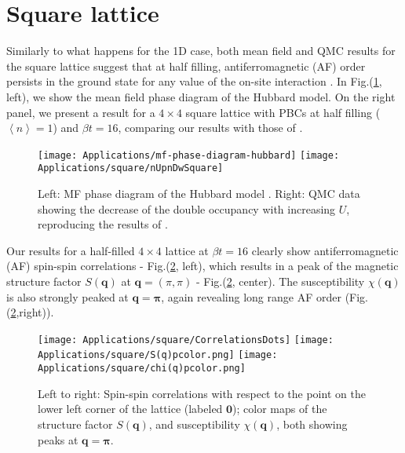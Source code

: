 \section{Square lattice}
\label{sec:square}

Similarly to what happens for the \acs{1D} case, both mean field and \ac{QMC} results for the square lattice suggest that at half filling, antiferromagnetic (\acs{AF}) order persists in the ground state for any value of the on-site interaction \cite{claveau_mean-field_2014, gouveia_magnetic_2015, white_numerical_1989, hirsch_two-dimensional_1985}.
In Fig.(\ref{fig:mfHubbardPhaseDiagram}, left), we show the mean field phase diagram of the Hubbard model.
On the right panel, we present a result for a $4 \times 4$ square lattice with \acs{PBC}s at half filling ($\left\langle n\right\rangle = 1$) and $\beta t = 16$, comparing our results with those of \cite{white_numerical_1989}.
\vspace{-0.4cm}
\begin{figure}[H]
\hspace{-0.18cm}
\texttt{[image: Applications/mf-phase-diagram-hubbard]}
\texttt{[image: Applications/square/nUpnDwSquare]}
\caption[Mean field phase diagram of the Hubbard model. \ac{QMC} data showing the decrease of the double occupancy with increasing $U$.]{Left: MF phase diagram of the Hubbard model \cite{gouveia_magnetic_2015}.
Right: \ac{QMC} data showing the decrease of the double occupancy with increasing $U$, reproducing the results of \cite{white_numerical_1989}.\label{fig:mfHubbardPhaseDiagram}}
\end{figure}
Our results for a half-filled $4 \times 4$ lattice at $\beta t = 16 $ clearly show antiferromagnetic (\acs{AF}) spin-spin correlations - Fig.(\ref{fig:corrSq}, left), which results in a peak of the magnetic structure factor $S (\bm q)$ at $\bm q = (\pi, \pi)$ - Fig.(\ref{fig:corrSq}, center).
The susceptibility $\chi ( \bm q) $ is also strongly peaked at $\bm q = \bm \pi$, again revealing long range \acs{AF} order (Fig.(\ref{fig:corrSq},right)).
\begin{figure}[H]
\texttt{[image: Applications/square/CorrelationsDots]}
\texttt{[image: Applications/square/S(q)pcolor.png]}
\texttt{[image: Applications/square/chi(q)pcolor.png]}
\caption[Spin-spin correlations on the square lattice.
Magnetic structure factors showing a peak at $\bm q = \bm \pi$. Color maps of the structure factor $S ( \bm q)$, and susceptibility $\chi ( \bm q)$, both showing peaks at $\bm q = \bm\pi$.]{Left to right: Spin-spin correlations with respect to the point on the lower left corner of the lattice (labeled $\bm 0$); 
color maps of the structure factor $S ( \bm q)$, and susceptibility $\chi ( \bm q)$, both showing peaks at $\bm q = \bm\pi$.
 \label{fig:corrSq}}
\end{figure}

